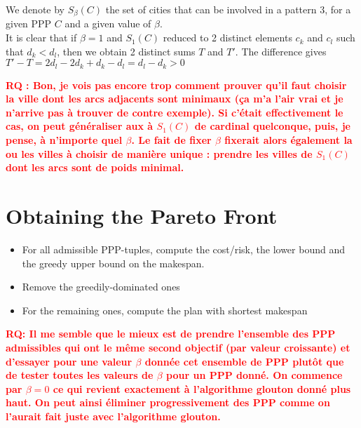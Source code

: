 \documentclass[a4paper,11pt]{article}
\newcommand{\myred}[1]
{\textcolor{red}{\bf {#1}}
}
\begin{document}
\noindent
We denote by $S_{\beta}(C)$ the set of cities that can be involved in a pattern 3, for a given PPP $C$ and a given value of $\beta$.\\


\noindent
It is clear that if $\beta = 1$ and $S_1(C)$ reduced to 2 distinct elements $c_k$ and $c_l$ such that $d_k < d_l$, then we obtain 2 distinct sums $T$ and $T'$. The difference gives $T' - T = 2d_l - 2d_k + d_k - d_l = d_l - d_k > 0$


\myred{RQ : Bon, je vois pas encore trop comment prouver qu'il faut choisir la ville dont les arcs adjacents sont minimaux (ça m'a l'air vrai et je n'arrive pas à trouver de contre exemple). Si c'était effectivement le cas, on peut généraliser aux à $S_1(C)$ de cardinal quelconque, puis, je pense, à n'importe quel $\beta$. Le fait de fixer $\beta$ fixerait alors également la ou les villes à choisir de manière unique : prendre les villes de $S_1(C)$ dont les arcs sont de poids minimal.}

\section{Obtaining the Pareto Front}
\begin{itemize}
 \item For all admissible PPP-tuples, compute the cost/risk, the lower bound and the greedy upper bound on the makespan. 
 \item Remove the greedily-dominated ones
 \item For the remaining ones, compute the plan with shortest makespan
\end{itemize}

\myred{RQ: Il me semble que le mieux est de prendre l'ensemble des PPP admissibles qui ont le même second objectif (par valeur croissante) et d'essayer pour une valeur $\beta$ donnée cet ensemble de PPP plutôt que de tester toutes les valeurs de $\beta$ pour un PPP donné. On commence par $\beta = 0$ ce qui revient exactement à l'algorithme glouton donné plus haut. On peut ainsi éliminer progressivement des PPP comme on l'aurait fait juste avec l'algorithme glouton.}
\end{document}
